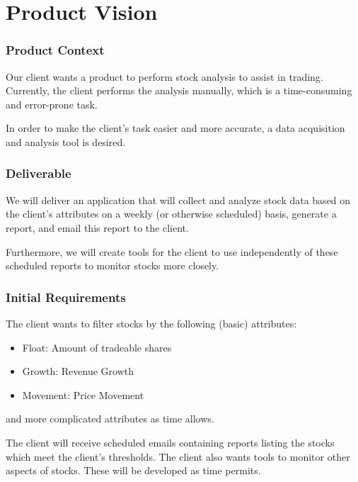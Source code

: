 \documentclass{beamer}
\begin{document}

\section{Product Vision}
\begin{frame}
\frametitle{Product Context}
Our client wants a product to perform stock analysis to assist in trading. Currently, the client performs the analysis manually, which is a time-consuming and error-prone task. \vspace{0.3cm}

In order to make the client's task easier and more accurate, a data acquisition and analysis tool is desired.


\end{frame}

\begin{frame}
\frametitle{Deliverable}
We will deliver an application that will collect and analyze stock data based on the client's attributes on a weekly (or otherwise scheduled) basis, generate a report, and email this report to the client. \vspace{0.3cm}

Furthermore, we will create tools for the client to use independently of these scheduled reports to monitor stocks more closely.
\end{frame}

\begin{frame}
\frametitle{Initial Requirements}
The client wants to filter stocks by the following (basic) attributes: 
\begin{itemize}
\item Float: Amount of tradeable shares
\item Growth: Revenue Growth 
\item Movement: Price Movement
\end{itemize} 
and more complicated attributes as time allows. \vspace{0.3cm}

The client will receive scheduled emails containing reports listing the stocks which meet the client's thresholds.  The client also wants tools to monitor other aspects of stocks. These will be developed as time permits.
\end{frame}
\end{document}
